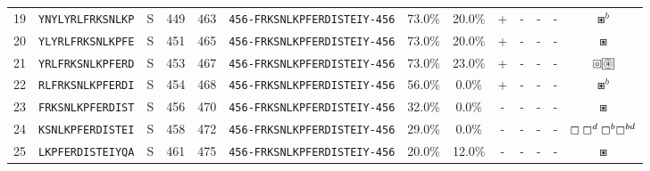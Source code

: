 \begin{tabular}{rcccccccccccc}
19 &  \texttt{YNYLYRLFRKSNLKP} &       S &    449 &   463 &  \texttt{{\scriptsize 456-}FRKSNLKPFERDISTEIY{\scriptsize -456}} &                          73.0\% &                           20.0\% &          + &           - &          - &           - &                                                                                                                         $ \boxast^b $ \\
20 &  \texttt{YLYRLFRKSNLKPFE} &       S &    451 &   465 &  \texttt{{\scriptsize 456-}FRKSNLKPFERDISTEIY{\scriptsize -456}} &                          73.0\% &                           20.0\% &          + &           - &          - &           - &                                                                                                                           $ \boxast $ \\
21 &  \texttt{YRLFRKSNLKPFERD} &       S &    453 &   467 &  \texttt{{\scriptsize 456-}FRKSNLKPFERDISTEIY{\scriptsize -456}} &                          73.0\% &                           23.0\% &          + &           - &          - &           - &                                                                        $ \boxcircle \setlength{\fboxsep}{0.5pt} \boxed{\circledast} $ \\
22 &  \texttt{RLFRKSNLKPFERDI} &       S &    454 &   468 &  \texttt{{\scriptsize 456-}FRKSNLKPFERDISTEIY{\scriptsize -456}} &                          56.0\% &                            0.0\% &          + &           - &          - &           - &                                                                                                                         $ \boxast^b $ \\
23 &  \texttt{FRKSNLKPFERDIST} &       S &    456 &   470 &  \texttt{{\scriptsize 456-}FRKSNLKPFERDISTEIY{\scriptsize -456}} &                          32.0\% &                            0.0\% &          - &           - &          - &           - &                                                                                                                           $ \boxast $ \\
24 &  \texttt{KSNLKPFERDISTEI} &       S &    458 &   472 &  \texttt{{\scriptsize 456-}FRKSNLKPFERDISTEIY{\scriptsize -456}} &                          29.0\% &                            0.0\% &          - &           - &          - &           - &                                                                                  $ \boxempty \boxempty^d \boxempty^b \boxempty^{bd} $ \\
25 &  \texttt{LKPFERDISTEIYQA} &       S &    461 &   475 &  \texttt{{\scriptsize 456-}FRKSNLKPFERDISTEIY{\scriptsize -456}} &                          20.0\% &                           12.0\% &          - &           - &          - &           - &                                                                                                                           $ \boxast $ \\

\end{tabular}
